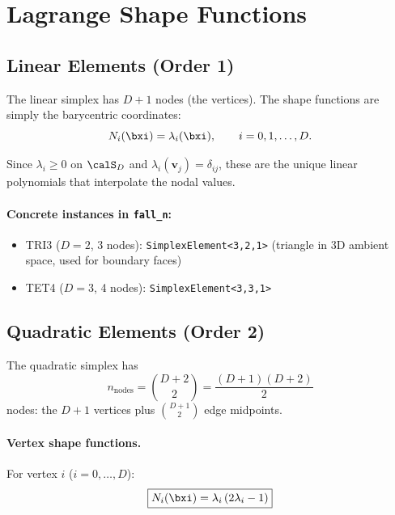 \section{Lagrange Shape Functions}
\label{sec:shape_functions}

\subsection{Linear Elements (Order 1)}

The linear simplex has $D+1$ nodes (the vertices).  The shape functions are
simply the barycentric coordinates:
\begin{equation}
  N_i(\bxi) = \lambda_i(\bxi), \qquad i = 0, 1, \dots, D.
  \label{eq:shape_linear}
\end{equation}

Since $\lambda_i \ge 0$ on $\calS_D$ and $\lambda_i(\mathbf{v}_j) =
\delta_{ij}$, these are the unique linear polynomials that interpolate the
nodal values.

\paragraph{Concrete instances in \texttt{fall\_n}:}
\begin{itemize}[nosep]
  \item TRI3 ($D=2$, 3 nodes): \texttt{SimplexElement<3,2,1>} (triangle in 3D
        ambient space, used for boundary faces)
  \item TET4 ($D=3$, 4 nodes): \texttt{SimplexElement<3,3,1>}
\end{itemize}


\subsection{Quadratic Elements (Order 2)}
\label{sec:quadratic_simplex}

The quadratic simplex has
\begin{equation}
  n_{\text{nodes}} = \binom{D+2}{2} = \frac{(D+1)(D+2)}{2}
  \label{eq:numnodes_quadratic}
\end{equation}
nodes: the $D+1$ vertices plus $\binom{D+1}{2}$ edge midpoints.

\paragraph{Vertex shape functions.}
For vertex $i$ ($i=0,\dots,D$):
\begin{equation}
  \boxed{N_i(\bxi) = \lambda_i\,(2\lambda_i - 1)}
  \label{eq:shape_vertex_quad}
\end{equation}

